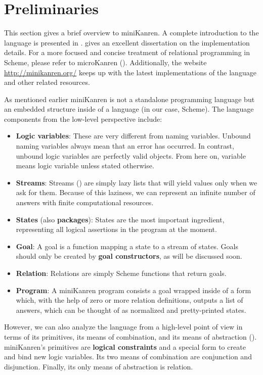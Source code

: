 \section{Preliminaries}
\label{prelim}
This section gives a brief overview to miniKanren.
A complete introduction to the language is presented in \textcite{reasoned}.
\textcite{byrdphd} gives an excellent dissertation on the implementation details.
For a more focused and concise treatment of relational programming in Scheme, please refer to microKanren (\cite{micro}).
Additionally, the website \url{http://minikanren.org/} keeps up with the latest implementations of the language and other related resources.

As mentioned earlier miniKanren is not a standalone programming language but an embedded structure inside of a language (in our case, Scheme). The language components from the low-level perspective include:
\begin{itemize}
\item \textbf{Logic variables}: These are very different from naming variables. Unbound naming variables always mean that an error has occurred. In contrast, unbound logic variables are perfectly valid objects. From here on, variable means logic variable unless stated otherwise.
\item \textbf{Streams}: Streams (\cite{sicp}) are simply lazy lists that will yield values only when we ask for them. Because of this laziness, we can represent an infinite number of answers with finite computational resources.
\item \textbf{States} (also \textbf{packages}): States are the most important ingredient, representing all logical assertions in the program at the moment.
\item \textbf{Goal}: A goal is a function mapping a state to a stream of states. Goals should only be created by \textbf{goal constructors}, as will be discussed soon.
\item \textbf{Relation}: Relations are simply Scheme functions that return goals.
\item \textbf{Program}: A miniKanren program consists a goal wrapped inside of a  form which, with the help of zero or more relation definitions, outputs a list of answers, which can be thought of as normalized and pretty-printed states.
\end{itemize}

However, we can also analyze the language from a high-level point of view in terms of its primitives, its means of combination, and its means of abstraction (\cite[359]{sicp}). miniKanren's primitives are \textbf{logical constraints} and a special form to create and bind new logic variables. Its two means of combination are conjunction and disjunction. Finally, its only means of abstraction is relation.

